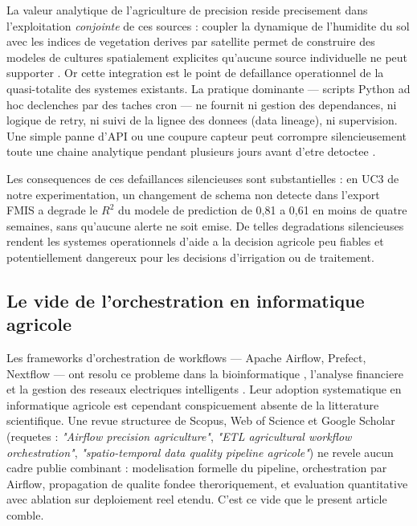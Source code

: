 \documentclass[12pt,a4paper]{article}
\theoremstyle{plain}
\theoremstyle{definition}
\theoremstyle{remark}
\begin{document}
La valeur analytique de l'agriculture de precision reside precisement dans
l'exploitation \emph{conjointe} de ces sources : coupler la dynamique de
l'humidite du sol avec les indices de vegetation derives par satellite
permet de construire des modeles de cultures spatialement explicites
qu'aucune source individuelle ne peut supporter
\cite{ndvi_sentinel2_2023,ndvi_timeseries_2022}.
Or cette integration est le point de defaillance operationnel de la
quasi-totalite des systemes existants. La pratique dominante --- scripts
Python ad hoc declenches par des taches cron --- ne fournit ni gestion
des dependances, ni logique de retry, ni suivi de la lignee des donnees
(data lineage), ni supervision. Une simple panne d'API ou une coupure
capteur peut corrompre silencieusement toute une chaine analytique
pendant plusieurs jours avant d'etre detoctee
\cite{pipeline_survey_2024}.

Les consequences de ces defaillances silencieuses sont substantielles :
en UC3 de notre experimentation, un changement de schema non detecte dans
l'export FMIS a degrade le $R^2$ du modele de prediction de 0,81 a 0,61
en moins de quatre semaines, sans qu'aucune alerte ne soit emise.
De telles degradations silencieuses rendent les systemes operationnels
d'aide a la decision agricole peu fiables et potentiellement dangereux
pour les decisions d'irrigation ou de traitement.

\subsection{Le vide de l'orchestration en informatique agricole}

Les frameworks d'orchestration de workflows --- Apache Airflow, Prefect,
Nextflow --- ont resolu ce probleme dans la bioinformatique
\cite{bioinformatics_workflow}, l'analyse financiere et la gestion des
reseaux electriques intelligents \cite{smartgrid_etl}. Leur adoption
systematique en informatique agricole est cependant conspicuement absente
de la litterature scientifique. Une revue structuree de Scopus, Web of
Science et Google Scholar (requetes :
\textit{"Airflow precision agriculture"},
\textit{"ETL agricultural workflow orchestration"},
\textit{"spatio-temporal data quality pipeline agricole"})
ne revele aucun cadre publie combinant : modelisation formelle du pipeline,
orchestration par Airflow, propagation de qualite fondee theroriquement,
et evaluation quantitative avec ablation sur deploiement reel etendu.
C'est ce vide que le present article comble.
\end{document}
